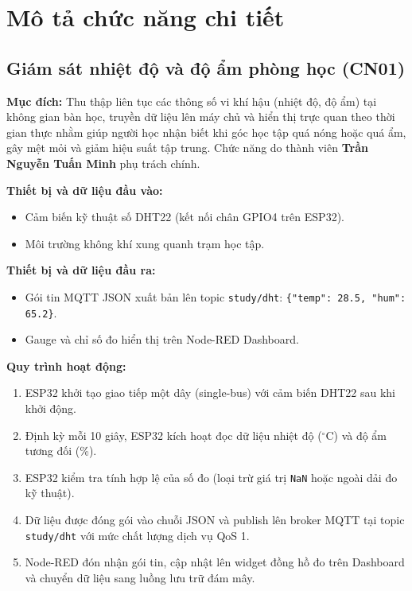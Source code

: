 \section{Mô tả chức năng chi tiết}

\subsection{Giám sát nhiệt độ và độ ẩm phòng học (CN01)}
\textbf{Mục đích:}
Thu thập liên tục các thông số vi khí hậu (nhiệt độ, độ ẩm) tại không gian bàn học, truyền dữ liệu lên máy chủ và hiển thị trực quan theo thời gian thực nhằm giúp người học nhận biết khi góc học tập quá nóng hoặc quá ẩm, gây mệt mỏi và giảm hiệu suất tập trung. Chức năng do thành viên \textbf{Trần Nguyễn Tuấn Minh} phụ trách chính.

\textbf{Thiết bị và dữ liệu đầu vào:}
\begin{itemize}
    \item Cảm biến kỹ thuật số DHT22 (kết nối chân GPIO4 trên ESP32).
    \item Môi trường không khí xung quanh trạm học tập.
\end{itemize}

\textbf{Thiết bị và dữ liệu đầu ra:}
\begin{itemize}
    \item Gói tin MQTT JSON xuất bản lên topic \texttt{study/dht}: \texttt{\{"temp": 28.5, "hum": 65.2\}}.
    \item Gauge và chỉ số đo hiển thị trên Node-RED Dashboard.
\end{itemize}

\textbf{Quy trình hoạt động:}
\begin{enumerate}
    \item ESP32 khởi tạo giao tiếp một dây (single-bus) với cảm biến DHT22 sau khi khởi động.
    \item Định kỳ mỗi 10 giây, ESP32 kích hoạt đọc dữ liệu nhiệt độ ($^\circ$C) và độ ẩm tương đối (\%).
    \item ESP32 kiểm tra tính hợp lệ của số đo (loại trừ giá trị \texttt{NaN} hoặc ngoài dải đo kỹ thuật).
    \item Dữ liệu được đóng gói vào chuỗi JSON và publish lên broker MQTT tại topic \texttt{study/dht} với mức chất lượng dịch vụ QoS 1.
    \item Node-RED đón nhận gói tin, cập nhật lên widget đồng hồ đo trên Dashboard và chuyển dữ liệu sang luồng lưu trữ đám mây.
\end{enumerate}

